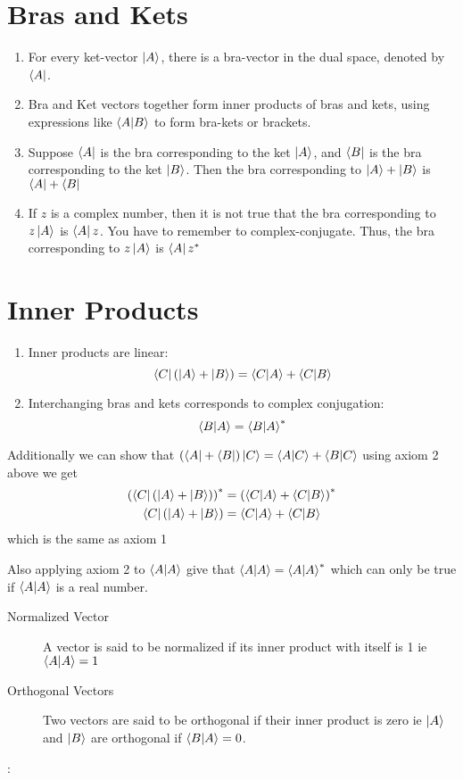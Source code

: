 \documentclass[12pt,a4paper,twocolumn]{article}
\begin{document}
\section{Bras and Kets}
\begin{enumerate}
	\item For every ket-vector $\ket{A}$, there is a bra-vector in the dual space, denoted by $\bra{A}$.
	\item Bra and Ket vectors together form inner products of bras and kets, using expressions like $\braket{A}{B}$ to form bra-kets or brackets.
	\item Suppose $\bra{A}$ is the bra corresponding to the ket $\ket{A}$, and $\bra{B}$ is the bra corresponding to the ket $\ket{B}$. Then the bra corresponding to $\ket{A}+\ket{B}$ is $\bra{A}+\bra{B}$
	\item If $z$ is a complex number, then it is not true that the bra corresponding to $z\ket{A}$ is $\bra{A}z$. You have to remember to complex-conjugate. Thus, the bra corresponding to $z\ket{A}$ is $\bra{A}z^{*}$
\end{enumerate}
\section{Inner Products}
\begin{enumerate}
\item Inner products are linear: 
\begin{equation}
        \bra{C}\left( \ket{A} + \ket{B} \right) = \braket{C}{A} + \braket{C}{B}
\end{equation}
\item  Interchanging bras and kets corresponds to complex conjugation:
\begin{equation}
	\braket{B}{A} = \braket{B}{A}^{*}
\end{equation}
\end{enumerate}
Additionally we can show that $\left(\bra{A}+\bra{B}\right)\ket{C} = \braket{A}{C}+\braket{B}{C}$ using axiom 2 above we get     \begin{align}
	\left(\bra{C}\left(\ket{A}+\ket{B}\right)\right)^{*}&=\left(\braket{C}{A} + \braket{C}{B}\right)^{*}\\
	\bra{C}\left(\ket{A}+\ket{B}\right)&=\braket{C}{A} + \braket{C}{B}
 \end{align}
which is the same as axiom 1

Also applying axiom 2 to $\braket{A}{A}$ give that $\braket{A}{A} = \braket{A}{A}^{*}$ which can only be true if $\braket{A}{A}$ is a real number.

\begin{description}
    \item[Normalized Vector] A vector is said to be normalized if its inner product with itself is 1 ie $\braket{A}{A}=1$
    \item[Orthogonal Vectors] Two vectors are said to be orthogonal if their inner product is zero ie $\ket{A}$ and $\ket{B}$ are orthogonal if $\braket{B}{A}=0$.
\end{description}

    : 
\end{document}
